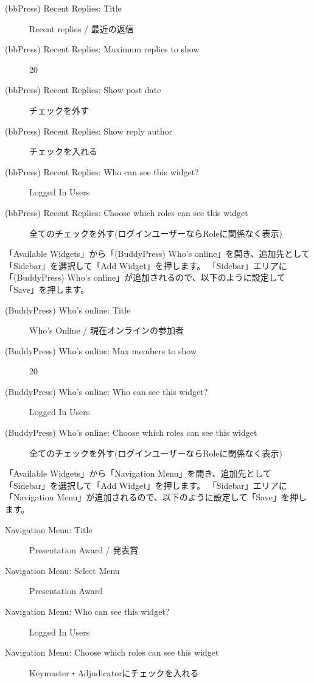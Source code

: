\documentclass[titlepage,10pt,a4paper,uplatex]{jsbook}
\begin{document}
\begin{description}
\item[(bbPress) Recent Replies: Title] Recent replies / 最近の返信
\item[(bbPress) Recent Replies: Maximum replies to show] 20
\item[(bbPress) Recent Replies: Show post date] チェックを外す
\item[(bbPress) Recent Replies: Show reply author] チェックを入れる
\item[(bbPress) Recent Replies: Who can see this widget?] Logged In Users
\item[(bbPress) Recent Replies: Choose which roles can see this widget] 全てのチェックを外す(ログインユーザーならRoleに関係なく表示)
\end{description}

「Available Widgets」から「(BuddyPress) Who's online」を開き、追加先として「Sidebar」を選択して「Add Widget」を押します。
「Sidebar」エリアに「(BuddyPress) Who's online」が追加されるので、以下のように設定して「Save」を押します。

\begin{description}
\item[(BuddyPress) Who's online: Title] Who's Online / 現在オンラインの参加者
\item[(BuddyPress) Who's online: Max members to show] 20
\item[(BuddyPress) Who's online: Who can see this widget?] Logged In Users
\item[(BuddyPress) Who's online: Choose which roles can see this widget] 全てのチェックを外す(ログインユーザーならRoleに関係なく表示)
\end{description}

「Available Widgets」から「Navigation Menu」を開き、追加先として「Sidebar」を選択して「Add Widget」を押します。
「Sidebar」エリアに「Navigation Menu」が追加されるので、以下のように設定して「Save」を押します。

\begin{description}
\item[Navigation Menu: Title] Presentation Award / 発表賞
\item[Navigation Menu: Select Menu] Presentation Award
\item[Navigation Menu: Who can see this widget?] Logged In Users
\item[Navigation Menu: Choose which roles can see this widget] Keymaster・Adjudicatorにチェックを入れる
\end{description}
\end{document}
